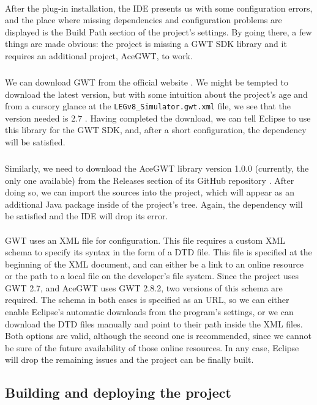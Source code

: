 \paragraph{}
After the plug-in installation, the IDE presents us with some configuration errors, and the place where missing dependencies and configuration problems are displayed is the Build Path section of the project's settings. By going there, a few things are made obvious: the project is missing a GWT SDK library and it requires an additional project, AceGWT, to work.
\subparagraph{}
We can download GWT from the official website \cite{gwtweb}. We might be tempted to download the latest version, but with some intuition about the project's age and from a cursory glance at the \verb|LEGv8_Simulator.gwt.xml| file, we see that the version needed is 2.7 \cite{gwt2.7web}. Having completed the download, we can tell Eclipse to use this library for the GWT SDK, and, after a short configuration, the dependency will be satisfied.
\subparagraph{}
Similarly, we need to download the AceGWT library version 1.0.0 (currently, the only one available) from the Releases section of its GitHub repository \cite{web:acegwtgit}. After doing so, we can import the sources into the project, which will appear as an additional Java package inside of the project's tree. Again, the dependency will be satisfied and the IDE will drop its error.
\paragraph{}
GWT uses an XML file for configuration. This file requires a custom XML schema to specify its syntax in the form of a DTD file. This file is specified at the beginning of the XML document, and can either be a link to an online resource or the path to a local file on the developer's file system. Since the project uses GWT 2.7, and AceGWT uses GWT 2.8.2, two versions of this schema are required. The schema in both cases is specified as an URL, so we can either enable Eclipse's automatic downloads from the program's settings, or we can download the DTD files manually and point to their path inside the XML files. Both options are valid, although the second one is recommended, since we cannot be sure of the future availability of those online resources. In any case, Eclipse will drop the remaining issues and the project can be finally built.
\subsection{Building and deploying the project}
